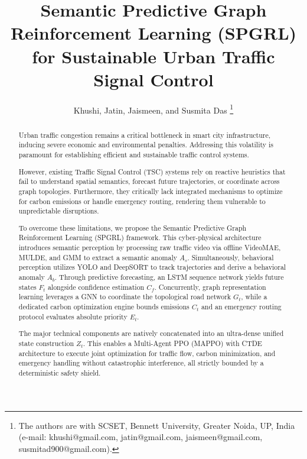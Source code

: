\documentclass[journal]{IEEEtran}
\begin{document}
\title{Semantic Predictive Graph Reinforcement Learning (SPGRL) for Sustainable Urban Traffic Signal Control}

\author{Khushi, Jatin, Jaismeen, and Susmita Das
\thanks{The authors are with SCSET, Bennett University, Greater Noida, UP, India (e-mail: khushi@gmail.com, jatin@gmail.com, jaismeen@gmail.com, susmitad900@gmail.com).}}


\maketitle

\begin{abstract}
Urban traffic congestion remains a critical bottleneck in smart city infrastructure, inducing severe economic and environmental penalties. Addressing this volatility is paramount for establishing efficient and sustainable traffic control systems.

However, existing Traffic Signal Control (TSC) systems rely on reactive heuristics that fail to understand spatial semantics, forecast future trajectories, or coordinate across graph topologies. Furthermore, they critically lack integrated mechanisms to optimize for carbon emissions or handle emergency routing, rendering them vulnerable to unpredictable disruptions.

To overcome these limitations, we propose the Semantic Predictive Graph Reinforcement Learning (SPGRL) framework. This cyber-physical architecture introduces semantic perception by processing raw traffic video via offline VideoMAE, MULDE, and GMM to extract a semantic anomaly $A_s$. Simultaneously, behavioral perception utilizes YOLO and DeepSORT to track trajectories and derive a behavioral anomaly $A_b$. Through predictive forecasting, an LSTM sequence network yields future states $F_t$ alongside confidence estimation $C_f$. Concurrently, graph representation learning leverages a GNN to coordinate the topological road network $G_t$, while a dedicated carbon optimization engine bounds emissions $C_t$ and an emergency routing protocol evaluates absolute priority $E_t$.

The major technical components are natively concatenated into an ultra-dense unified state construction $Z_t$. This enables a Multi-Agent PPO (MAPPO) with CTDE architecture to execute joint optimization for traffic flow, carbon minimization, and emergency handling without catastrophic interference, all strictly bounded by a deterministic safety shield.


\end{abstract}
\end{document}
